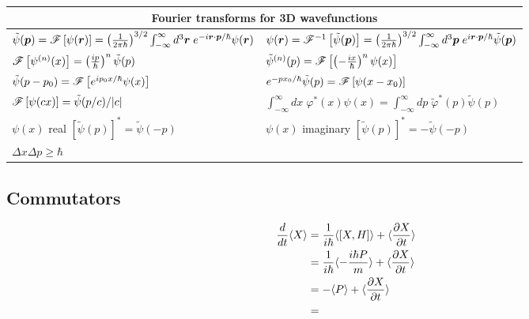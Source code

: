 \begin{table}[h!]
    \centering
    \begin{tabular}{l|l}
        \multicolumn{2}{c}{Fourier transforms for 3D wavefunctions}\\
        \hline
        $\tilde{\psi}(\bp)=\fourier{\psi(\bR)}=\left(\frac{1}{2\pi\hbar}\right)^{3/2}\int_{-\infty}^\infty d^3\bR\;e^{-i\bR\cdot\bp/\hbar}\psi(\bR)$&$\psi(\bR)=\ifourier{\tilde{\psi}(\bp)}=\left(\frac{1}{2\pi\hbar}\right)^{3/2}\int_{-\infty}^\infty d^3\bp\;e^{i\bR\cdot\bp/\hbar}\tilde{\psi}(\bp)$\\
        $\fourier{\psi^{(n)}(x)}=\left(\frac{ip}{\hbar}\right)^n\tilde{\psi}(p)$&$\tilde{\psi}^{(n)}(p)=\fourier{\left(-\frac{ix}{\hbar}\right)^n\psi(x)}$\\
        $\tilde{\psi}(p-p_0)=\fourier{e^{ip_0x/\hbar}\psi(x)}$&$e^{-px_0/\hbar}\tilde{\psi}(p)=\fourier{\psi(x-x_0)}$\\
        $\fourier{\psi(cx)}=\tilde{\psi}(p/c)/|c|$&$\int_{-\infty}^\infty dx\;\varphi^*(x)\psi(x)=\int_{-\infty}^\infty dp\;\tilde{\varphi}^*(p)\tilde{\psi}(p)$\\
        $\psi(x)$ real $[\tilde{\psi}(p)]^*=\tilde{\psi}(-p)$&$\psi(x)$ imaginary $[\tilde{\psi}(p)]^*=-\tilde{\psi}(-p)$\\
        $\Delta x\Delta p\geq\hbar$&$$
    \end{tabular}
\end{table}
\begin{comment}
\end{comment}
\subsection*{Commutators}
\begin{table}[h!]
    \centering
\end{table} 





  \begin{align*}
    \frac{d}{dt}\langle X\rangle&=\frac{1}{i\hbar}\langle[X,H]\rangle+\langle\frac{\partial X}{\partial t}\rangle
    \\
    &=\frac{1}{i\hbar}\langle-\frac{i\hbar P}{m}\rangle+\langle\frac{\partial X}{\partial t}\rangle\\
    &=-\langle P\rangle+\langle\frac{\partial X}{\partial t}\rangle\\
    &=
  \end{align*}